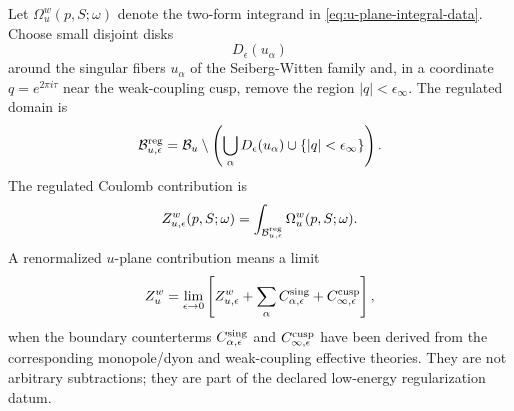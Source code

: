 \begin{definition}
\label{def:regularized-u-plane-integral}
Let \(\Omega_u^w(p,S;\omega)\) denote the two-form integrand in
\eqref{eq:u-plane-integral-data}.  Choose small disjoint disks
\[
  D_\epsilon(u_\alpha)
\]
around the singular fibers \(u_\alpha\) of the Seiberg-Witten family and, in a
coordinate \(q=e^{2\pi i\tau}\) near the weak-coupling cusp, remove the region
\(|q|<\epsilon_\infty\).  The regulated domain is
\[
  \mathcal B_{u,\epsilon}^{\rm reg}
  =
  \mathcal B_u
  \setminus
  \left(
    \bigcup_\alpha D_\epsilon(u_\alpha)
    \cup\{|q|<\epsilon_\infty\}
  \right).
\]
The regulated Coulomb contribution is
\begin{equation}
  Z_{u,\epsilon}^w(p,S;\omega)
  =
  \int_{\mathcal B_{u,\epsilon}^{\rm reg}}
  \Omega_u^w(p,S;\omega).
  \label{eq:regulated-u-plane-integral}
\end{equation}
A renormalized \(u\)-plane contribution means a limit
\begin{equation}
  Z_u^w
  =
  \lim_{\epsilon\to0}
  \left[
    Z_{u,\epsilon}^w
    +\sum_\alpha C_{\alpha,\epsilon}^{\rm sing}
    +C_{\infty,\epsilon}^{\rm cusp}
  \right],
  \label{eq:renormalized-u-plane-integral}
\end{equation}
when the boundary counterterms \(C_{\alpha,\epsilon}^{\rm sing}\) and
\(C_{\infty,\epsilon}^{\rm cusp}\) have been derived from the corresponding
monopole/dyon and weak-coupling effective theories.  They are not arbitrary
subtractions; they are part of the declared low-energy regularization datum.
\end{definition}

